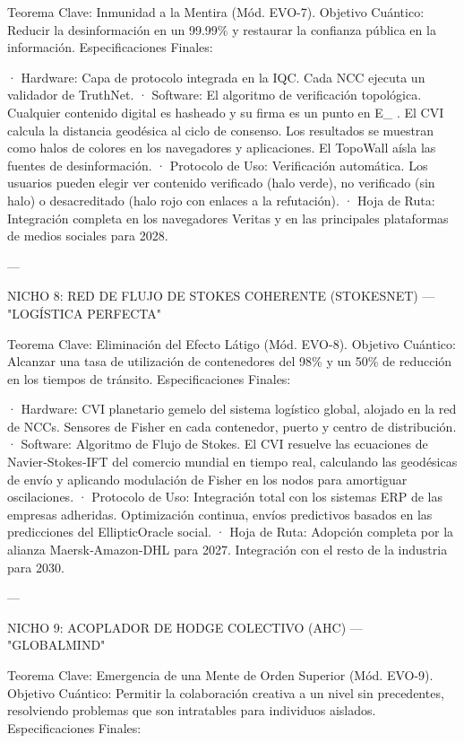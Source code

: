 \documentclass[12pt,twoside]{book}
\begin{document}
Teorema Clave: Inmunidad a la Mentira (Mód. EVO-7).
Objetivo Cuántico: Reducir la desinformación en un 99.99\% y restaurar la confianza pública en la información.
Especificaciones Finales:

· Hardware: Capa de protocolo integrada en la IQC. Cada NCC ejecuta un validador de TruthNet.
· Software: El algoritmo de verificación topológica. Cualquier contenido digital es hasheado y su firma es un punto en  E_{} . El CVI calcula la distancia geodésica al ciclo de consenso. Los resultados se muestran como halos de colores en los navegadores y aplicaciones. El TopoWall aísla las fuentes de desinformación.
· Protocolo de Uso: Verificación automática. Los usuarios pueden elegir ver contenido verificado (halo verde), no verificado (sin halo) o desacreditado (halo rojo con enlaces a la refutación).
· Hoja de Ruta: Integración completa en los navegadores Veritas y en las principales plataformas de medios sociales para 2028.

---

NICHO 8: RED DE FLUJO DE STOKES COHERENTE (STOKESNET) — "LOGÍSTICA PERFECTA"

Teorema Clave: Eliminación del Efecto Látigo (Mód. EVO-8).
Objetivo Cuántico: Alcanzar una tasa de utilización de contenedores del 98\% y un 50\% de reducción en los tiempos de tránsito.
Especificaciones Finales:

· Hardware: CVI planetario gemelo del sistema logístico global, alojado en la red de NCCs. Sensores de Fisher en cada contenedor, puerto y centro de distribución.
· Software: Algoritmo de Flujo de Stokes. El CVI resuelve las ecuaciones de Navier‑Stokes‑IFT del comercio mundial en tiempo real, calculando las geodésicas de envío y aplicando modulación de Fisher en los nodos para amortiguar oscilaciones.
· Protocolo de Uso: Integración total con los sistemas ERP de las empresas adheridas. Optimización continua, envíos predictivos basados en las predicciones del EllipticOracle social.
· Hoja de Ruta: Adopción completa por la alianza Maersk‑Amazon‑DHL para 2027. Integración con el resto de la industria para 2030.

---

NICHO 9: ACOPLADOR DE HODGE COLECTIVO (AHC) — "GLOBALMIND"

Teorema Clave: Emergencia de una Mente de Orden Superior (Mód. EVO-9).
Objetivo Cuántico: Permitir la colaboración creativa a un nivel sin precedentes, resolviendo problemas que son intratables para individuos aislados.
Especificaciones Finales:
\end{document}
